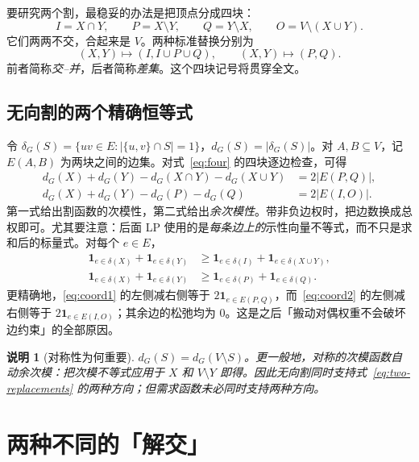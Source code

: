 \documentclass[UTF8,11pt,a4paper]{ctexart}
\newtheorem{remark}[definition]{说明}
\newcommand{\cut}{\delta}
\begin{document}
要研究两个割，最稳妥的办法是把顶点分成四块：
\begin{equation}\label{eq:four}
I=X\cap Y,\qquad P=X\setminus Y,\qquad Q=Y\setminus X,\qquad O=V\setminus(X\cup Y).
\end{equation}
它们两两不交，合起来是 $V$。两种标准替换分别为
\begin{equation}\label{eq:two-replacements}
(X,Y)\mapsto(I,I\cup P\cup Q),\qquad
(X,Y)\mapsto(P,Q).
\end{equation}
前者简称\emph{交--并}，后者简称\emph{差集}。这个四块记号将贯穿全文。

\subsection{无向割的两个精确恒等式}

令 $\cut_G(S)=\{uv\in E:|\{u,v\}\cap S|=1\}$，$d_G(S)=|\cut_G(S)|$。对 $A,B\subseteq V$，记 $E(A,B)$ 为两块之间的边集。对式~\eqref{eq:four} 的四块逐边检查，可得
\begin{align}
d_G(X)+d_G(Y)-d_G(X\cap Y)-d_G(X\cup Y)&=2|E(P,Q)|,\label{eq:cutsub}\\
d_G(X)+d_G(Y)-d_G(P)-d_G(Q)&=2|E(I,O)|.\label{eq:cutposi}
\end{align}
第一式给出割函数的次模性，第二式给出\emph{余次模性}。带非负边权时，把边数换成总权即可。尤其要注意：后面 LP 使用的是\emph{每条边上的}示性向量不等式，而不只是求和后的标量式。对每个 $e\in E$，
\begin{align}
\mathbf1_{e\in\cut(X)}+\mathbf1_{e\in\cut(Y)}
&\ge\mathbf1_{e\in\cut(I)}+\mathbf1_{e\in\cut(X\cup Y)},\label{eq:coord1}\\
\mathbf1_{e\in\cut(X)}+\mathbf1_{e\in\cut(Y)}
&\ge\mathbf1_{e\in\cut(P)}+\mathbf1_{e\in\cut(Q)}.\label{eq:coord2}
\end{align}
更精确地，\eqref{eq:coord1} 的左侧减右侧等于 $2\mathbf1_{e\in E(P,Q)}$，而~\eqref{eq:coord2} 的左侧减右侧等于 $2\mathbf1_{e\in E(I,O)}$；其余边的松弛均为 $0$。这是之后「搬动对偶权重不会破坏边约束」的全部原因。

\begin{remark}[对称性为何重要]
$d_G(S)=d_G(V\setminus S)$。更一般地，对称的次模函数自动余次模：把次模不等式应用于 $X$ 和 $V\setminus Y$ 即得。因此无向割同时支持式~\eqref{eq:two-replacements} 的两种方向；但\emph{需求函数}未必同时支持两种方向。
\end{remark}

\section{两种不同的「解交」}
\end{document}
